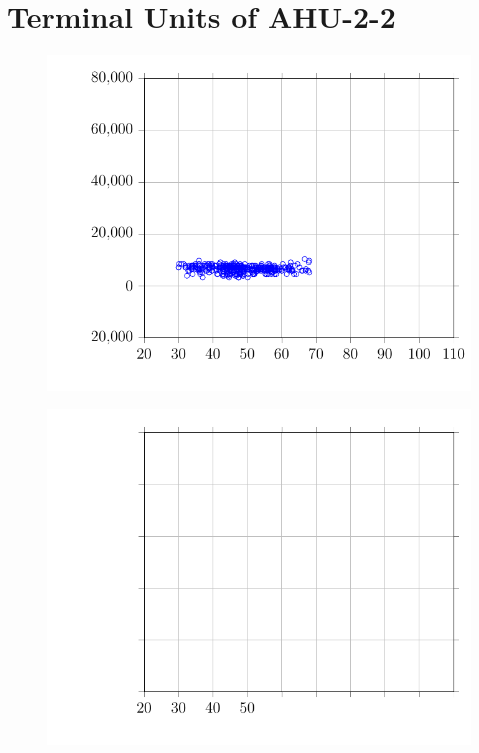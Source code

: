 \clearpage

\section{Terminal Units of AHU-2-2}

\begin{figure}
\centering
\includegraphics{Plots/07/2017-06-27-1026-BtuhrvsOADryBulbTemperatureNOAAF.pdf}
\caption{}
\label{fig:2017-06-27-1026-BtuhrvsOADryBulbTemperatureNOAAF}
\end{figure}

\begin{figure}
\centering
\includegraphics{Plots/08/2017-06-27-1058-BtuhrvsOADryBulbTemperatureNOAAF.pdf}
\caption{}
\label{fig:2017-06-27-1058-BtuhrvsOADryBulbTemperatureNOAAF}
\end{figure}



